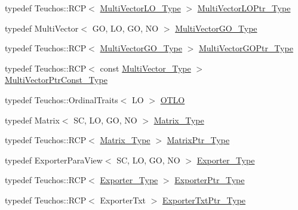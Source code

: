 \begin{DoxyCompactItemize}
\item 
typedef Teuchos\+::\+R\+CP$<$ \hyperlink{classFEDD_1_1RefinementFactory_ae731f05f6a28d13f917230f914f29037}{Multi\+Vector\+L\+O\+\_\+\+Type} $>$ \hyperlink{classFEDD_1_1RefinementFactory_a002c7179ca2f22db4505da2db0f798e9}{Multi\+Vector\+L\+O\+Ptr\+\_\+\+Type}
\item 
typedef Multi\+Vector$<$ GO, LO, GO, NO $>$ \hyperlink{classFEDD_1_1RefinementFactory_a433fd79c1903a3771cffbaed6f5dbd71}{Multi\+Vector\+G\+O\+\_\+\+Type}
\item 
typedef Teuchos\+::\+R\+CP$<$ \hyperlink{classFEDD_1_1RefinementFactory_a433fd79c1903a3771cffbaed6f5dbd71}{Multi\+Vector\+G\+O\+\_\+\+Type} $>$ \hyperlink{classFEDD_1_1RefinementFactory_a9e4318c3bc9a63b25f6283955ff80d49}{Multi\+Vector\+G\+O\+Ptr\+\_\+\+Type}
\item 
typedef Teuchos\+::\+R\+CP$<$ const \hyperlink{classFEDD_1_1RefinementFactory_af7c4cb285d95e61820d63b9344a90976}{Multi\+Vector\+\_\+\+Type} $>$ \hyperlink{classFEDD_1_1RefinementFactory_af904cdbfa726de22dcea9dfcc891114b}{Multi\+Vector\+Ptr\+Const\+\_\+\+Type}
\item 
typedef Teuchos\+::\+Ordinal\+Traits$<$ LO $>$ \hyperlink{classFEDD_1_1RefinementFactory_a266b4b5a15cabb39df492db6e4f53e3e}{O\+T\+LO}
\item 
typedef Matrix$<$ SC, LO, GO, NO $>$ \hyperlink{classFEDD_1_1RefinementFactory_ab04c3bb37b70c0524f46b050aaec1914}{Matrix\+\_\+\+Type}
\item 
typedef Teuchos\+::\+R\+CP$<$ \hyperlink{classFEDD_1_1RefinementFactory_ab04c3bb37b70c0524f46b050aaec1914}{Matrix\+\_\+\+Type} $>$ \hyperlink{classFEDD_1_1RefinementFactory_a52d5a6625f207bc4df2c5ae3362e8ced}{Matrix\+Ptr\+\_\+\+Type}
\item 
typedef Exporter\+Para\+View$<$ SC, LO, GO, NO $>$ \hyperlink{classFEDD_1_1RefinementFactory_a268cb28ca6c68a4c32a912068c643933}{Exporter\+\_\+\+Type}
\item 
typedef Teuchos\+::\+R\+CP$<$ \hyperlink{classFEDD_1_1RefinementFactory_a268cb28ca6c68a4c32a912068c643933}{Exporter\+\_\+\+Type} $>$ \hyperlink{classFEDD_1_1RefinementFactory_ae74a8143ddf273f2a13df4055233759c}{Exporter\+Ptr\+\_\+\+Type}
\item 
typedef Teuchos\+::\+R\+CP$<$ Exporter\+Txt $>$ \hyperlink{classFEDD_1_1RefinementFactory_a08c0a0d5b375af33c924f90005302f91}{Exporter\+Txt\+Ptr\+\_\+\+Type}
\end{DoxyCompactItemize}

